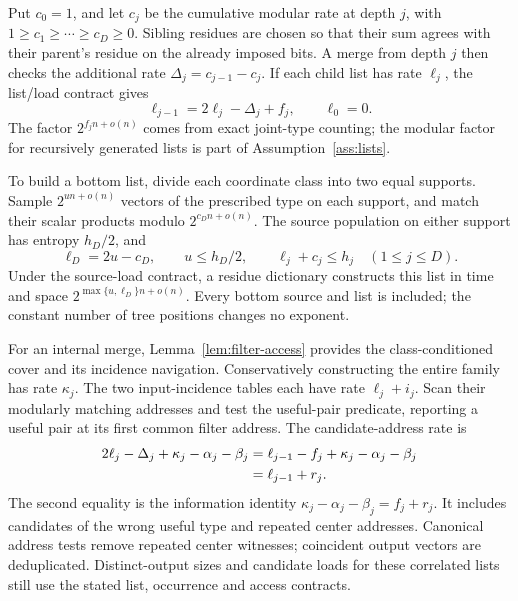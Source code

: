 \documentclass[10pt,a4paper]{article}
\theoremstyle{definition}
\begin{document}
Put $c_0=1$, and let $c_j$ be the cumulative modular rate at depth $j$,
with $1\ge c_1\ge\cdots\ge c_D\ge0$. Sibling residues are chosen so that
their sum agrees with their parent's residue on the already imposed bits.
A merge from depth $j$ then checks the additional rate
$\Delta_j=c_{j-1}-c_j$. If each child list has rate $\ell_j$, the list/load
contract gives
\begin{equation}
 \ell_{j-1}=2\ell_j-\Delta_j+f_j,\qquad \ell_0=0.
 \label{classical:recurrence}
\end{equation}
The factor $2^{f_jn+o(n)}$ comes from exact joint-type counting; the modular
factor for recursively generated lists is part of
Assumption~\ref{ass:lists}.

To build a bottom list, divide each coordinate class into two equal
supports. Sample $2^{un+o(n)}$ vectors of the prescribed type on each
support, and match their scalar products modulo $2^{c_Dn+o(n)}$.
The source population on either support has entropy $h_D/2$, and
\begin{equation}
 \ell_D=2u-c_D,\qquad
 u\le h_D/2,\qquad
 \ell_j+c_j\le h_j\quad(1\le j\le D).
 \label{classical:capacity}
\end{equation}
Under the source-load contract, a residue dictionary constructs this list
in time and space $2^{\max\{u,\ell_D\}n+o(n)}$. Every bottom source and
list is included; the constant number of tree positions changes no
exponent.

For an internal merge, Lemma~\ref{lem:filter-access} provides the
class-conditioned cover and its incidence navigation. Conservatively
constructing the entire family has rate $\kappa_j$. The two input-incidence
tables each have rate $\ell_j+i_j$. Scan their modularly matching
addresses and test the useful-pair predicate, reporting a useful pair at
its first common filter address. The candidate-address rate is
\begin{align}
 2\ell_j-\Delta_j+\kappa_j-\alpha_j-\beta_j
 &=\ell_{j-1}-f_j+\kappa_j-\alpha_j-\beta_j\notag\\
 &=\ell_{j-1}+r_j.
 \label{classical:candidates}
\end{align}
The second equality is the information identity
$\kappa_j-\alpha_j-\beta_j=f_j+r_j$.
It includes candidates of the wrong useful type and repeated center
addresses. Canonical address tests remove repeated center witnesses;
coincident output vectors are deduplicated. Distinct-output sizes and
candidate loads for these correlated lists still use the stated list,
occurrence and access contracts.
\end{document}
